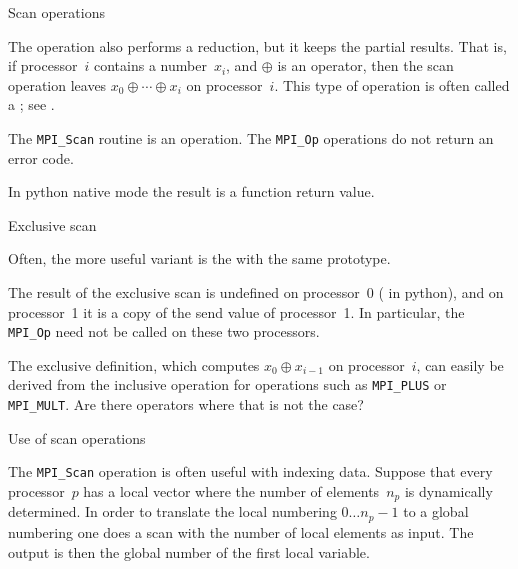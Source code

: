 
 {Scan operations}

\label{sec:scan}

The  operation also performs a reduction, but it keeps 
the partial results. That is, if processor~$i$ contains a number~$x_i$, 
and $\oplus$ is an operator,
then the scan operation leaves $x_0\oplus\cdots\oplus x_i$ on processor~$i$.
This type of operation is often called a ;
see .

The \lstinline$MPI_Scan$ routine is an  operation.
%
%
The \lstinline$MPI_Op$ operations do not return an error code.

In python native mode the result is a function return value.
%

 {Exclusive scan}

Often, the more useful variant is the 
%
%
with the same prototype. 

The result of the exclusive scan is undefined on processor~0
( in python),
and on processor~1 it is a copy of the send value of processor~1.
In particular, the \lstinline$MPI_Op$ need not be called on these two 
processors.

\begin{exercise}
  The exclusive definition, which computes
  $x_0\oplus x_{i-1}$ on processor~$i$, can easily be derived
  from the inclusive operation for operations such as \lstinline$MPI_PLUS$ or \lstinline$MPI_MULT$.
  Are there operators where that is not the case?
\end{exercise}

 {Use of scan operations}

The \lstinline$MPI_Scan$ operation is often useful with indexing data. Suppose that
every processor~$p$ has a local vector where the number of elements~$n_p$ is dynamically 
determined. In order to translate the local numbering $0\ldots n_p-1$ to a global numbering
one does a scan with the number of local elements as input. The output is then the global 
number of the first local variable.


